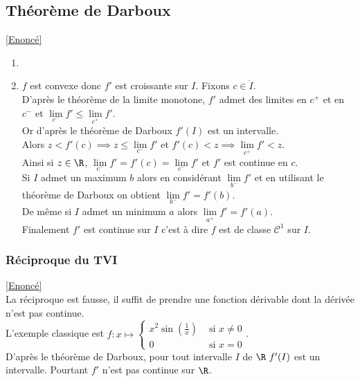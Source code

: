 \documentclass{book}
\begin{document}
	\subsection{Théorème de Darboux }
	\label{Théorème de Darboux corrigé}
	\textcolor{blue}{\hyperref[Théorème de Darboux]{[Enoncé]}}\\
	\begin{enumerate}[leftmargin=*]
		\item 
		\item $f$ est convexe donc $f'$ est croissante sur $I$. Fixons $c\in \ring{I}$.\\
		D'après le théorème de la limite monotone, $f'$ admet des limites en $c^+$ et en $c^-$ et $\underset{c^-}{\lim}f'\leq \underset{c^+}{\lim}f'$.\\
		Or d'après le théorème de Darboux $f'(I)$ est un intervalle.\\
		Alors $z<f'(c)\implies z\leq \underset{c^-}{\lim}f'$ et $f'(c)<z\implies \underset{c^+}{\lim}f'<z$.\\
		Ainsi si $z\in \R$, $\underset{c^-}{\lim}f'=f'(c)=\underset{c^-}{\lim}f'$ et $f'$ est continue en $c$.\\
		Si $I$ admet un maximum $b$ alors en considérant $\underset{b^-}{\lim}f'$ et en utilisant le théorème de Darboux on obtient $\underset{b^-}{\lim}f'=f'(b)$.\\
		De même si $I$ admet un minimum $a$ alors $\underset{a^+}{\lim}f'=f'(a)$.\\
		Finalement $f'$ est continue sur $I$ c'est à dire $f$ est de classe $\mathcal C^1$ sur $I$.
	\end{enumerate}
	
	\subsubsection{Réciproque du TVI }
	\label{Réciproque du TVI corrigé}
	\textcolor{blue}{\hyperref[Réciproque du TVI]{[Enoncé]}}\\
	La réciproque est fausse, il suffit de prendre une fonction dérivable dont la dérivée n'est pas continue.\\
	L'exemple classique est $f:x\mapsto \begin{cases} x^2\sin\left(\displaystyle\frac{1}{x}\right)&\mbox{ si }x\ne 0\\ 0&\mbox{ si }x=0\end{cases}$.\\
	D'après le théorème de Darboux, pour tout intervalle $I$ de $\R\ f'(I)$ est un intervalle. Pourtant $f'$ n'est pas continue sur $\R$.
	
\end{document}

